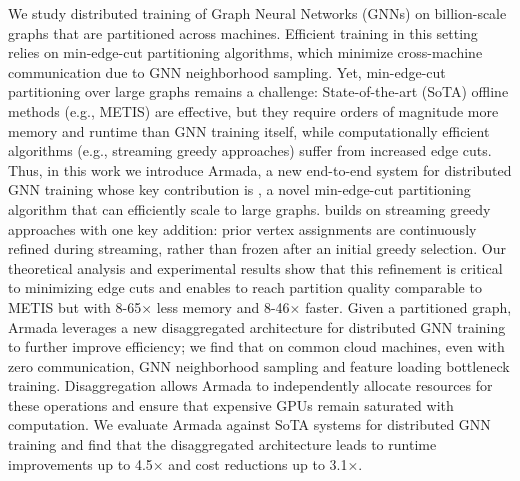We study distributed training of Graph Neural Networks (GNNs) on billion-scale graphs that are partitioned across machines. Efficient training in this setting relies on min-edge-cut partitioning algorithms, which minimize cross-machine communication due to GNN neighborhood sampling. Yet, min-edge-cut partitioning over large graphs remains a challenge: State-of-the-art (SoTA) offline methods (e.g., METIS) are effective, but they require orders of magnitude more memory and runtime than GNN training itself, while computationally efficient algorithms (e.g., streaming greedy approaches) suffer from increased edge cuts. Thus, in this work we introduce Armada, a new end-to-end system for distributed GNN training whose key contribution is \partitioning, a novel min-edge-cut partitioning algorithm that can efficiently scale to large graphs. \partitioning builds on streaming greedy approaches with one key addition: prior vertex assignments are continuously refined during streaming, rather than frozen after an initial greedy selection. Our theoretical analysis and experimental results show that this refinement is critical to minimizing edge cuts and enables \partitioning to reach partition quality comparable to METIS but with 8-65$\times$ less memory and 8-46$\times$ faster. Given a partitioned graph, Armada leverages a new disaggregated architecture for distributed GNN training to further improve efficiency; we find that on common cloud machines, even with zero communication, GNN neighborhood sampling and feature loading bottleneck training. Disaggregation allows Armada to independently allocate resources for these operations and ensure that expensive GPUs remain saturated with computation. We evaluate Armada against SoTA systems for distributed GNN training and find that the disaggregated architecture leads to runtime improvements up to 4.5$\times$ and cost reductions up to 3.1$\times$.
